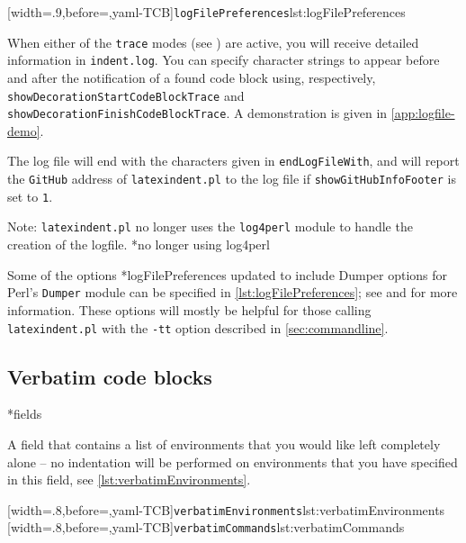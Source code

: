 \documentclass[10pt]{article}
\begin{document}
 [width=.9\linewidth,before=\centering,yaml-TCB]{\texttt{logFilePreferences}}{lst:logFilePreferences}

 When 
 either of the \texttt{trace} modes (see ) are active, you
 will receive detailed information in \texttt{indent.log}. You can specify character
 strings to appear before and after the notification of a found code block using,
 respectively, \texttt{showDecorationStartCodeBlockTrace} and
 \texttt{showDecorationFinishCodeBlockTrace}. A demonstration is given in
 \vref{app:logfile-demo}.%

 The log file will end with the characters given in \texttt{endLogFileWith}, and will
 report the \texttt{GitHub} address of \texttt{latexindent.pl} to the log file if
 \texttt{showGitHubInfoFooter} is set to \texttt{1}.

 Note: \texttt{latexindent.pl} no longer uses the \texttt{log4perl} module to handle the
 creation of the logfile. *{no longer using log4perl}%

 Some of the options *{logFilePreferences updated to include Dumper
 options} for Perl's \texttt{Dumper} module can be specified in
 \cref{lst:logFilePreferences}; see \cite{dumper} and \cite{dumperdemo} for more
 information. These options will mostly be helpful for those calling
 \texttt{latexindent.pl} with the \texttt{-tt} option described in
 \cref{sec:commandline}.%

\subsection{Verbatim code blocks}
*{fields}

 A field that contains a list of environments that you would like left completely alone
 -- no indentation will be performed on environments that you have specified in this
 field, see \cref{lst:verbatimEnvironments}. 

 \begin{cmhtcbraster}[raster column skip=.1\linewidth]
  [width=.8\linewidth,before=\centering,yaml-TCB]{\texttt{verbatimEnvironments}}{lst:verbatimEnvironments}
  [width=.8\linewidth,before=\centering,yaml-TCB]{\texttt{verbatimCommands}}{lst:verbatimCommands}
 \end{cmhtcbraster}
\end{document}
